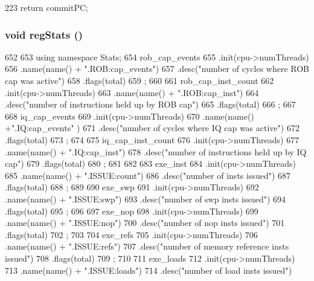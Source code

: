 \begin{DoxyCode}
223 { return commitPC; }
\end{DoxyCode}
\hypertarget{classBackEnd_a4dc637449366fcdfc4e764cdf12d9b11}{
\subsubsection[{regStats}]{\setlength{\rightskip}{0pt plus 5cm}void regStats ()}}
\label{classBackEnd_a4dc637449366fcdfc4e764cdf12d9b11}



\begin{DoxyCode}
652 {
653     using namespace Stats;
654     rob_cap_events
655         .init(cpu->numThreads)
656         .name(name() + ".ROB:cap_events")
657         .desc("number of cycles where ROB cap was active")
658         .flags(total)
659         ;
660 
661     rob_cap_inst_count
662         .init(cpu->numThreads)
663         .name(name() + ".ROB:cap_inst")
664         .desc("number of instructions held up by ROB cap")
665         .flags(total)
666         ;
667 
668     iq_cap_events
669         .init(cpu->numThreads)
670         .name(name() +".IQ:cap_events" )
671         .desc("number of cycles where IQ cap was active")
672         .flags(total)
673         ;
674 
675     iq_cap_inst_count
676         .init(cpu->numThreads)
677         .name(name() + ".IQ:cap_inst")
678         .desc("number of instructions held up by IQ cap")
679         .flags(total)
680         ;
681 
682 
683     exe_inst
684         .init(cpu->numThreads)
685         .name(name() + ".ISSUE:count")
686         .desc("number of insts issued")
687         .flags(total)
688         ;
689 
690     exe_swp
691         .init(cpu->numThreads)
692         .name(name() + ".ISSUE:swp")
693         .desc("number of swp insts issued")
694         .flags(total)
695         ;
696 
697     exe_nop
698         .init(cpu->numThreads)
699         .name(name() + ".ISSUE:nop")
700         .desc("number of nop insts issued")
701         .flags(total)
702         ;
703 
704     exe_refs
705         .init(cpu->numThreads)
706         .name(name() + ".ISSUE:refs")
707         .desc("number of memory reference insts issued")
708         .flags(total)
709         ;
710 
711     exe_loads
712         .init(cpu->numThreads)
713         .name(name() + ".ISSUE:loads")
714         .desc("number of load insts issued")
}
\end{DoxyCode}
